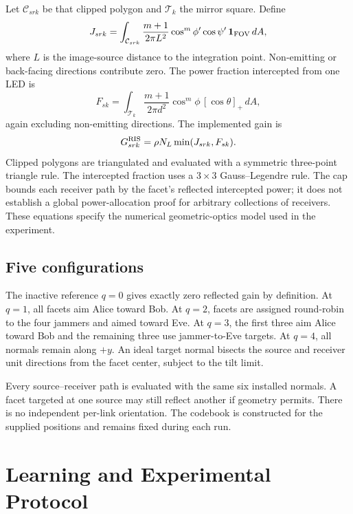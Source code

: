 \documentclass[journal,10pt,twocolumn]{IEEEtran}
\begin{document}
Let $\mathcal C_{srk}$ be that clipped polygon and $\mathcal T_k$ the mirror square. Define
\begin{equation}
J_{srk}=\int_{\mathcal C_{srk}}\frac{m+1}{2\pi L^2}
\cos^m\phi'\cos\psi'\,\mathbf1_{\rm FOV}\,dA,
\label{eq:aperture}
\end{equation}
where $L$ is the image-source distance to the integration point. Non-emitting or back-facing directions contribute zero. The power fraction intercepted from one LED is
\begin{equation}
F_{sk}=\int_{\mathcal T_k}\frac{m+1}{2\pi d^2}
\cos^m\phi\,[\cos\theta]_+\,dA,
\label{eq:intercept}
\end{equation}
again excluding non-emitting directions. The implemented gain is
\begin{equation}
G_{srk}^{\rm RIS}=\rho N_L\min(J_{srk},F_{sk}).
\label{eq:bound}
\end{equation}
Clipped polygons are triangulated and evaluated with a symmetric three-point triangle rule. The intercepted fraction uses a $3\times3$ Gauss--Legendre rule. The cap bounds each receiver path by the facet's reflected intercepted power; it does not establish a global power-allocation proof for arbitrary collections of receivers. These equations specify the numerical geometric-optics model used in the experiment.

\subsection{Five configurations}
The inactive reference $q=0$ gives exactly zero reflected gain by definition. At $q=1$, all facets aim Alice toward Bob. At $q=2$, facets are assigned round-robin to the four jammers and aimed toward Eve. At $q=3$, the first three aim Alice toward Bob and the remaining three use jammer-to-Eve targets. At $q=4$, all normals remain along $+y$. An ideal target normal bisects the source and receiver unit directions from the facet center, subject to the tilt limit.

Every source--receiver path is evaluated with the same six installed normals. A facet targeted at one source may still reflect another if geometry permits. There is no independent per-link orientation. The codebook is constructed for the supplied positions and remains fixed during each run.

\section{Learning and Experimental Protocol}
\end{document}
